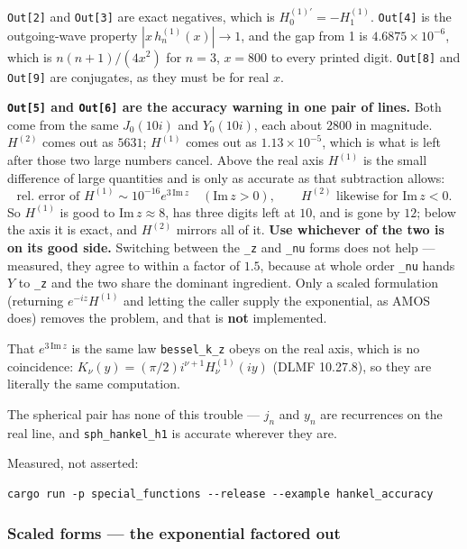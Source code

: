 \documentclass[11pt]{article}
\newcommand{\code}[1]{\texttt{#1}}
\begin{document}
\code{Out[2]} and \code{Out[3]} are exact negatives, which is
$H^{(1)\prime}_0 = -H^{(1)}_1$. \code{Out[4]} is the outgoing-wave
property $|x\,h^{(1)}_n(x)| \to 1$, and the gap from 1 is
$4.6875\times10^{-6}$, which is $n(n+1)/(4x^2)$ for $n=3$, $x=800$ to
every printed digit. \code{Out[8]} and \code{Out[9]} are conjugates, as
they must be for real $x$.

\textbf{\code{Out[5]} and \code{Out[6]} are the accuracy warning in one
pair of lines.} Both come from the same $J_0(10i)$ and $Y_0(10i)$, each
about $2800$ in magnitude. $H^{(2)}$ comes out as $5631$; $H^{(1)}$
comes out as $1.13\times10^{-5}$, which is what is left after those two
large numbers cancel. Above the real axis $H^{(1)}$ is the small
difference of large quantities and is only as accurate as that
subtraction allows:
\[
  \text{rel.\ error of } H^{(1)} \sim 10^{-16}e^{3\,\mathrm{Im}\,z}
  \quad(\mathrm{Im}\,z > 0),\qquad
  H^{(2)} \text{ likewise for } \mathrm{Im}\,z < 0 .
\]
So $H^{(1)}$ is good to $\mathrm{Im}\,z \approx 8$, has three digits
left at $10$, and is gone by $12$; below the axis it is exact, and
$H^{(2)}$ mirrors all of it. \textbf{Use whichever of the two is on its
good side.} Switching between the \code{\_z} and \code{\_nu} forms does
not help --- measured, they agree to within a factor of $1.5$, because
at whole order \code{\_nu} hands $Y$ to \code{\_z} and the two share the
dominant ingredient. Only a scaled formulation (returning
$e^{-iz}H^{(1)}$ and letting the caller supply the exponential, as AMOS
does) removes the problem, and that is \textbf{not} implemented.

That $e^{3\,\mathrm{Im}\,z}$ is the same law \code{bessel\_k\_z} obeys
on the real axis, which is no coincidence:
$K_\nu(y) = (\pi/2)i^{\nu+1}H^{(1)}_\nu(iy)$ (DLMF 10.27.8), so they are
literally the same computation.

The spherical pair has none of this trouble --- $j_n$ and $y_n$ are
recurrences on the real line, and \code{sph\_hankel\_h1} is accurate
wherever they are.

Measured, not asserted:
\begin{lstlisting}
cargo run -p special_functions --release --example hankel_accuracy
\end{lstlisting}

\subsubsection*{Scaled forms --- the exponential factored out}
\end{document}
